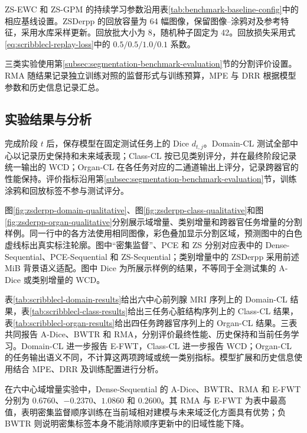 ZS-EWC 和 ZS-GPM 的持续学习参数沿用表\ref{tab:benchmark-baseline-config}中的相应基线设置\cite{kirkpatrick2017ewc,saha2021gpm}。ZSDerpp 的回放容量为 64 幅图像，保留图像--涂鸦对及参考特征，采用水库采样更新。回放批大小为 8，随机种子固定为 42。回放损失采用式\eqref{eq:scribblecl-replay-loss}中的 $0.5/0.5/1.0/0.1$ 系数。

三类实验使用第\ref{subsec:segmentation-benchmark-evaluation}节的分割评价设置。RMA 随结果记录独立训练对照的监督形式与训练预算，MPE 与 DRR 根据模型参数和历史信息记录汇总。


\subsection{实验结果与分析}
\label{sec:scribblecl-platform-integration}
\label{sec:scribblecl-platform}
\label{sec:scribblecl-benchmark-connection}

完成阶段 $t$ 后，保存模型在固定测试任务上的 Dice $d_{t,j}$。Domain-CL 测试全部中心以记录历史保持和未来域表现；Class-CL 按已见类别评分，并在最终阶段记录统一输出的 WCD；Organ-CL 在各任务对应的二通道输出上评分，记录跨器官的性能保持。评价指标沿用第\ref{subsec:segmentation-benchmark-evaluation}节，训练涂鸦和回放标签不参与测试评分。

图\ref{fig:zsderpp-domain-qualitative}、图\ref{fig:zsderpp-class-qualitative}和图\ref{fig:zsderpp-organ-qualitative}分别展示域增量、类别增量和跨器官任务增量的分割样例。同一行中的各方法使用相同图像，彩色叠加显示分割区域，预测图中的白色虚线标出真实标注轮廓。图中“密集监督”、PCE 和 ZS 分别对应表中的 Dense-Sequential、PCE-Sequential 和 ZS-Sequential；类别增量中的 ZSDerpp 采用前述 MiB 背景语义适配。图中 Dice 为所展示样例的结果，不等同于全测试集的 A-Dice 或类别增量的 WCD。

\label{subsec:scribblecl-results}
\label{subsec:scribblecl-experimental-analysis}

表\ref{tab:scribblecl-domain-results}给出六中心前列腺 MRI 序列上的 Domain-CL 结果，表\ref{tab:scribblecl-class-results}给出三任务心脏结构序列上的 Class-CL 结果，表\ref{tab:scribblecl-organ-results}给出四任务跨器官序列上的 Organ-CL 结果。三表共同报告 A-Dice、BWTR 和 RMA，分别评价最终性能、历史保持和当前任务学习。Domain-CL 进一步报告 E-FWT，Class-CL 进一步报告 WCD；Organ-CL 的任务输出语义不同，不计算这两项跨域或统一类别指标。模型扩展和历史信息使用结合 MPE、DRR 及训练配置进行分析。



在六中心域增量实验中，Dense-Sequential 的 A-Dice、BWTR、RMA 和 E-FWT 分别为 $0.6760$、$-0.2370$、$1.0860$ 和 $0.2600$。其 RMA 与 E-FWT 为表中最高值，表明密集监督顺序训练在当前域相对建模与未来域泛化方面具有优势；负 BWTR 则说明密集标签本身不能消除顺序更新中的旧域性能下降。

